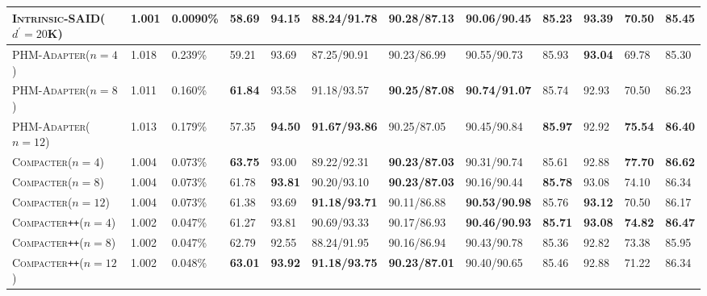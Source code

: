 \documentclass{article}
\newcommand{\compacter}{\textsc{Compacter}\xspace}
\newcommand{\compacteronlyff}{\textsc{Compacter}\texttt{++}\xspace} %
\newcommand{\phmadapter}{\textsc{PHM-Adapter}\xspace}
\newcommand{\intrinsic}{\textsc{Intrinsic-SAID}\xspace}
\begin{document}
\begin{table}[tp]
\begin{adjustbox}{max width=\textwidth}
\begin{tabular}{l@{\hskip 0.02in}|l@{\hskip 0.05in}l@{\hskip 0.01in}|l@{\hskip 0.08in}l@{\hskip 0.08in}l@{\hskip 0.08in}l@{\hskip 0.08in}l@{\hskip 0.08in}l@{\hskip 0.08in}l@{\hskip 0.08in}l|l}
\intrinsic ($d^{\prime}=20$K) &1.001& 0.0090\%& \textbf{58.69} &  \textbf{94.15} &  88.24/91.78 &  90.28/87.13 &  90.06/90.45 &  \textbf{85.23} &  \textbf{93.39} &  70.50 &  \textbf{85.45} \\ 
\midrule 
\phmadapter ($n=4$)  & 1.018 &0.239\% & 59.21 &  93.69 &  87.25/90.91 &  90.23/86.99 &  90.55/90.73 &  85.93 &  \textbf{93.04} &  69.78 &  85.30  \\ %
\phmadapter ($n=8$)  &1.011 &0.160\% & \textbf{61.84} &  93.58 &  91.18/93.57 &  \textbf{90.25/87.08} &  \textbf{90.74/91.07} &  85.74 &  92.93 &  70.50 &  86.23 \\%
\phmadapter ($n=12$) &1.013 & 0.179\% & 57.35 &  \textbf{94.50} &  \textbf{91.67/93.86} &  90.25/87.05 &  90.45/90.84 &  \textbf{85.97} &  92.92 &  \textbf{75.54} &  \textbf{86.40}  \\ %
\midrule 
\compacter ($n=4$) &1.004& 0.073\%& \textbf{63.75} &  93.00 &  89.22/92.31 &  \textbf{90.23/87.03} &  90.31/90.74 &  85.61 &  92.88 &  \textbf{77.70} &  \textbf{86.62} \\ %
\compacter ($n=8$) & 1.004&0.073\%&61.78 &  \textbf{93.81} &    90.20/93.10 &  \textbf{90.23/87.03} &  90.16/90.44 &  \textbf{85.78} &  93.08 &  74.10 &  86.34 \\ %
\compacter ($n=12$) &1.004&0.073\%& 61.38 &  93.69 &  \textbf{91.18/93.71} &  90.11/86.88 &  \textbf{90.53/90.98} &  85.76 &  \textbf{93.12} &  70.50 &  86.17 \\%
\midrule 
\compacteronlyff ($n=4$) & 1.002&  0.047\%&  61.27 &  93.81 &  90.69/93.33 &  90.17/86.93 &  \textbf{90.46/90.93} &  \textbf{85.71} &  \textbf{93.08} &  \textbf{74.82} &  \textbf{86.47} \\%
\compacteronlyff ($n=8$)  & 1.002&  0.047\%&  62.79 &  92.55 &  88.24/91.95 &  90.16/86.94 &  90.43/90.78 &  85.36 &  92.82 &  73.38 &  85.95 \\%
\compacteronlyff ($n=12$)  &1.002&0.048\%&  \textbf{63.01} &  \textbf{93.92} &  \textbf{91.18/93.75} &  \textbf{90.23/87.01} &   90.40/90.65 &  85.46 &  92.88 &  71.22 &  86.34 \\%
\bottomrule
\end{tabular}



\end{adjustbox}
\end{table}
\end{document}

